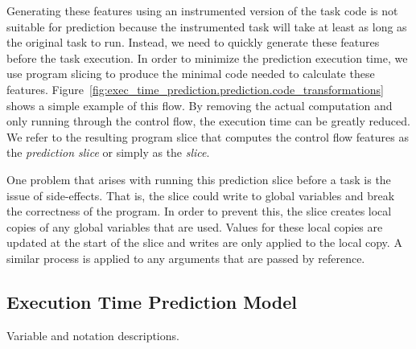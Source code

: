 Generating these features using an instrumented version of the task code is not
suitable for prediction because the instrumented task will take at least as
long as the original task to run. Instead, we need to quickly generate these
features before the task execution. In order to minimize the prediction
execution time, we use program slicing to produce the minimal code needed to
calculate these features.
Figure~\ref{fig:exec_time_prediction.prediction.code_transformations} shows a
simple example of this flow. By removing the actual computation and only
running through the control flow, the execution time can be greatly reduced. We
refer to the resulting program slice that computes the control flow features as
the \emph{prediction slice} or simply as the \emph{slice}.

One problem that arises with running this prediction slice before a task is the
issue of side-effects. That is, the slice could write to global variables and
break the correctness of the program. In order to prevent this, the slice
creates local copies of any global variables that are used. Values for these
local copies are updated at the start of the slice and writes are only applied
to the local copy. A similar process is applied to any arguments that are
passed by reference.

\subsection{Execution Time Prediction Model}
\label{sec:exec_time_prediction.prediction.model}

\begin{table}[tb]
  \begin{center}
    \begin{small}
    
    \end{small}
    \caption{Variable and notation descriptions.}
    \label{tab:exec_time_prediction.prediction.variables}
  \end{center}
\end{table}

